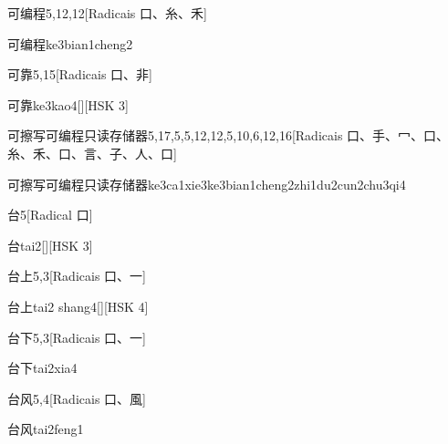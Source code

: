 \begin{entry}{可编程}{5,12,12}[Radicais ⼝、⽷、⽲]
  \begin{phonetics}{可编程}{ke3bian1cheng2}
  \end{phonetics}
\end{entry}

\begin{entry}{可靠}{5,15}[Radicais ⼝、⾮]
  \begin{phonetics}{可靠}{ke3kao4}[][HSK 3]
  \end{phonetics}
\end{entry}

\begin{entry*}{可擦写可编程只读存储器}{5,17,5,5,12,12,5,10,6,12,16}[Radicais ⼝、⼿、⼍、⼝、⽷、⽲、⼝、⾔、⼦、⼈、⼝]
  \begin{phonetics}{可擦写可编程只读存储器}{ke3ca1xie3ke3bian1cheng2zhi1du2cun2chu3qi4}
  \end{phonetics}
\end{entry*}

\begin{entry}{台}{5}[Radical ⼝]
  \begin{phonetics}{台}{tai2}[][HSK 3]
  \end{phonetics}
\end{entry}

\begin{entry}{台上}{5,3}[Radicais ⼝、⼀]
  \begin{phonetics}{台上}{tai2 shang4}[][HSK 4]
  \end{phonetics}
\end{entry}

\begin{entry}{台下}{5,3}[Radicais ⼝、⼀]
  \begin{phonetics}{台下}{tai2xia4}
  \end{phonetics}
\end{entry}

\begin{entry}{台风}{5,4}[Radicais ⼝、⾵]
  \begin{phonetics}{台风}{tai2feng1}
  \end{phonetics}
\end{entry}

